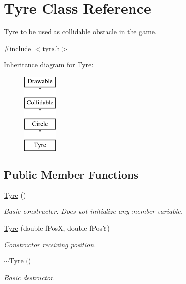 \hypertarget{class_tyre}{}\section{Tyre Class Reference}
\label{class_tyre}


\hyperlink{class_tyre}{Tyre} to be used as collidable obstacle in the game.  




{\ttfamily \#include $<$tyre.\+h$>$}

Inheritance diagram for Tyre\+:\begin{figure}[H]
\begin{center}
\leavevmode
\includegraphics[height=4.000000cm]{class_tyre}
\end{center}
\end{figure}
\subsection*{Public Member Functions}
\begin{DoxyCompactItemize}
\item 
\hypertarget{class_tyre_a162dbaad7ae74443df530dfb147fb694}{}\hyperlink{class_tyre_a162dbaad7ae74443df530dfb147fb694}{Tyre} ()\label{class_tyre_a162dbaad7ae74443df530dfb147fb694}

\begin{DoxyCompactList}\small\item\em Basic constructor. Does not initialize any member variable. \end{DoxyCompactList}\item 
\hyperlink{class_tyre_aa8316602e846dd79412579a2c3ad92c7}{Tyre} (double f\+Pos\+X, double f\+Pos\+Y)
\begin{DoxyCompactList}\small\item\em Constructor receiving position. \end{DoxyCompactList}\item 
\hypertarget{class_tyre_a3ace196877f68acd82b89e8cd33825ec}{}\hyperlink{class_tyre_a3ace196877f68acd82b89e8cd33825ec}{$\sim$\+Tyre} ()\label{class_tyre_a3ace196877f68acd82b89e8cd33825ec}

\begin{DoxyCompactList}\small\item\em Basic destructor. \end{DoxyCompactList}\end{DoxyCompactItemize}
